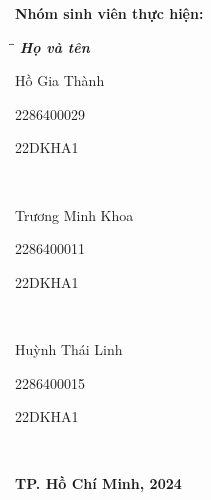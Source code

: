 \begin{titlepage}
		\textbf{Nhóm sinh viên thực hiện:}
		\begin{tabbing}
			\hspace{8cm}\=\hspace{4cm}\=\hspace{3cm} \kill
			{\it \textbf{Họ và tên}}\\
			\begin{bfseries}Hồ Gia Thành\end{bfseries}\> \begin{bfseries}2286400029\end{bfseries}\> \begin{bfseries}22DKHA1\end{bfseries}\\
			\begin{bfseries}Trương Minh Khoa\end{bfseries}\> \begin{bfseries}2286400011\end{bfseries}\> \begin{bfseries}22DKHA1\end{bfseries}\\
			\begin{bfseries}Huỳnh Thái Linh\end{bfseries}\> \begin{bfseries}2286400015\end{bfseries}\> \begin{bfseries}22DKHA1\end{bfseries}\\
		\end{tabbing}
		\vspace{110pt}
		\begin{center}
			\textbf{TP. Hồ Chí Minh, 2024}
		\end{center}
	\end{titlepage}